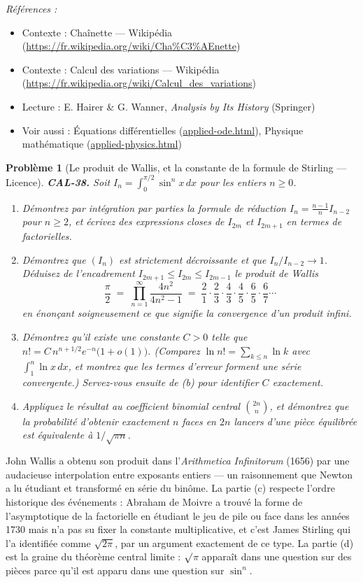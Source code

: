 \documentclass[11pt]{article}
\newtheorem{problem}{Problème}
\newenvironment{refs}{\par\small\noindent\emph{Références :}\begin{itemize}\setlength\itemsep{0pt}}{\end{itemize}\normalsize}
\begin{document}
\begin{refs}
\item Contexte : Chaînette --- Wikipédia (\url{https://fr.wikipedia.org/wiki/Cha%C3%AEnette})
\item Contexte : Calcul des variations --- Wikipédia (\url{https://fr.wikipedia.org/wiki/Calcul_des_variations})
\item Lecture : E. Hairer \& G. Wanner, \textit{Analysis by Its History} (Springer)
\item Voir aussi : Équations différentielles (\url{applied-ode.html}), Physique mathématique (\url{applied-physics.html})
\end{refs}

\bigskip

\begin{problem}[{Le produit de Wallis, et la constante de la formule de Stirling --- Licence}]
\textbf{CAL-38.} Soit $ I_n = \int_0^{\pi/2} \sin^n x \, dx $ pour les entiers $ n \ge 0 $.
\begin{enumerate}
\item[(a)] Démontrez par intégration par parties la formule de réduction $ I_n = \frac{n-1}{n} I_{n-2} $ pour
$ n \ge 2 $, et écrivez des expressions closes de $ I_{2m} $ et $ I_{2m+1} $ en termes
de factorielles.
\item[(b)] Démontrez que $ (I_n) $ est strictement décroissante et que $ I_{n}/I_{n-2} \to 1 $. Déduisez
de l'encadrement $ I_{2m+1} \le I_{2m} \le I_{2m-1} $ le produit de Wallis
\[ \frac{\pi}{2} \;=\; \prod_{n=1}^{\infty} \frac{4n^2}{4n^2-1}
\;=\; \frac{2}{1}\cdot\frac{2}{3}\cdot\frac{4}{3}\cdot\frac{4}{5}\cdot\frac{6}{5}\cdot\frac{6}{7}\cdots \]
en énonçant soigneusement ce que signifie la convergence d'un produit infini.
\item[(c)] Démontrez qu'il existe une constante $ C > 0 $ telle que
$ n! = C\, n^{n+1/2} e^{-n} \big(1 + o(1)\big) $. (Comparez $ \ln n! = \sum_{k\le n} \ln k $
avec $ \int_1^n \ln x \, dx $, et montrez que les termes d'erreur forment une série convergente.) Servez-vous ensuite
de (b) pour identifier $ C $ exactement.
\item[(d)] Appliquez le résultat au coefficient binomial central $ \binom{2n}{n} $, et démontrez que la
probabilité d'obtenir exactement $ n $ faces en $ 2n $ lancers d'une pièce équilibrée est équivalente à
$ 1/\sqrt{\pi n} $.
\end{enumerate}

\end{problem}

\noindent John Wallis a obtenu son produit dans l'\textit{Arithmetica Infinitorum} (1656) par une
audacieuse interpolation entre exposants entiers --- un raisonnement que Newton a lu étudiant et transformé
en série du binôme. La partie (c) respecte l'ordre historique des événements : Abraham de Moivre
a trouvé la forme de l'asymptotique de la factorielle en étudiant le jeu de pile ou face dans les années 1730 mais n'a
pas su fixer la constante multiplicative, et c'est James Stirling qui l'a identifiée comme
$ \sqrt{2\pi} $, par un argument exactement de ce type. La partie (d) est la graine du théorème central
limite : $\surd$$\pi$ apparaît dans une question sur des pièces parce qu'il est apparu dans une question sur
$ \sin^n $.
\end{document}
